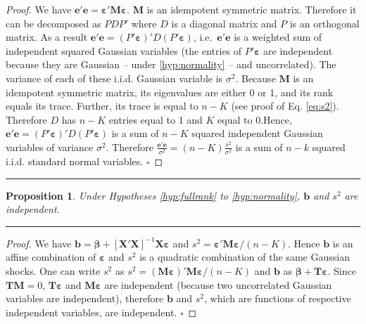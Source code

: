 \documentclass[
]{book}
\newtheorem{proposition}{Proposition}[chapter]
\theoremstyle{definition}
\theoremstyle{definition}
\theoremstyle{definition}
\theoremstyle{definition}
\theoremstyle{remark}
\begin{document}
\begin{proof}
We have \(\mathbf{e}'\mathbf{e}=\boldsymbol\varepsilon'\mathbf{M}\boldsymbol\varepsilon\). \(\mathbf{M}\) is an idempotent symmetric matrix. Therefore it can be decomposed as \(PDP'\) where \(D\) is a diagonal matrix and \(P\) is an orthogonal matrix. As a result \(\mathbf{e}'\mathbf{e} = (P'\boldsymbol\varepsilon)'D(P'\boldsymbol\varepsilon)\), i.e.~\(\mathbf{e}'\mathbf{e}\) is a weighted sum of independent squared Gaussian variables (the entries of \(P'\boldsymbol\varepsilon\) are independent because they are Gaussian -- under \ref{hyp:normality} -- and uncorrelated). The variance of each of these i.i.d. Gaussian variable is \(\sigma^2\). Because \(\mathbf{M}\) is an idempotent symmetric matrix, its eigenvalues are either 0 or 1, and its rank equals its trace. Further, its trace is equal to \(n-K\) (see proof of Eq. \eqref{eq:s2}). Therefore \(D\) has \(n-K\) entries equal to 1 and \(K\) equal to 0.Hence, \(\mathbf{e}'\mathbf{e} = (P'\boldsymbol\varepsilon)'D(P'\boldsymbol\varepsilon)\) is a sum of \(n-K\) squared independent Gaussian variables of variance \(\sigma^2\). Therefore \(\frac{\mathbf{e}'\mathbf{e}}{\sigma^2} = (n-K)\frac{s^2}{\sigma^2}\) is a sum of \(n-k\) squared i.i.d. standard normal variables. \(\square\)
\end{proof}

\begin{center}\rule{0.5\linewidth}{0.5pt}\end{center}

\begin{proposition}
\protect\hypertarget{prp:indeps2b}{}\label{prp:indeps2b}Under Hypotheses \ref{hyp:fullrank} to \ref{hyp:normality}, \(\mathbf{b}\) and \(s^2\) are independent.
\end{proposition}

\begin{center}\rule{0.5\linewidth}{0.5pt}\end{center}

\begin{proof}
We have \(\mathbf{b}=\boldsymbol\beta + [\mathbf{X}'{\mathbf{X}}]^{-1}\mathbf{X}\boldsymbol\varepsilon\) and \(s^2 = \boldsymbol\varepsilon' \mathbf{M} \boldsymbol\varepsilon/(n-K)\). Hence \(\mathbf{b}\) is an affine combination of \(\boldsymbol\varepsilon\) and \(s^2\) is a quadratic combination of the same Gaussian shocks. One can write \(s^2\) as \(s^2 = (\mathbf{M}\boldsymbol\varepsilon)' \mathbf{M} \boldsymbol\varepsilon/(n-K)\) and \(\mathbf{b}\) as \(\boldsymbol\beta + \mathbf{T}\boldsymbol\varepsilon\). Since \(\mathbf{T}\mathbf{M}=0\), \(\mathbf{T}\boldsymbol\varepsilon\) and \(\mathbf{M}\boldsymbol\varepsilon\) are independent (because two uncorrelated Gaussian variables are independent), therefore \(\mathbf{b}\) and \(s^2\), which are functions of respective independent variables, are independent. \(\square\)
\end{proof}
\end{document}
